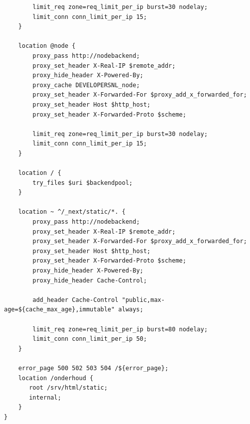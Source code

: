 \begin{verbatim}
        limit_req zone=req_limit_per_ip burst=30 nodelay;
        limit_conn conn_limit_per_ip 15;
    }

    location @node {
        proxy_pass http://nodebackend;
        proxy_set_header X-Real-IP $remote_addr;
        proxy_hide_header X-Powered-By;
        proxy_cache DEVELOPERSNL_node;
        proxy_set_header X-Forwarded-For $proxy_add_x_forwarded_for;
        proxy_set_header Host $http_host;
        proxy_set_header X-Forwarded-Proto $scheme;

        limit_req zone=req_limit_per_ip burst=30 nodelay;
        limit_conn conn_limit_per_ip 15;
    }

    location / {
        try_files $uri $backendpool;
    }

    location ~ ^/_next/static/*. {
        proxy_pass http://nodebackend;
        proxy_set_header X-Real-IP $remote_addr;
        proxy_set_header X-Forwarded-For $proxy_add_x_forwarded_for;
        proxy_set_header Host $http_host;
        proxy_set_header X-Forwarded-Proto $scheme;
        proxy_hide_header X-Powered-By;
        proxy_hide_header Cache-Control;

        add_header Cache-Control "public,max-age=${cache_max_age},immutable" always;

        limit_req zone=req_limit_per_ip burst=80 nodelay;
        limit_conn conn_limit_per_ip 50;
    }

    error_page 500 502 503 504 /${error_page};
    location /onderhoud {
       root /srv/html/static;
       internal;
    }
}
\end{verbatim}

